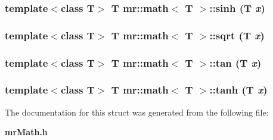 \subsubsection{\setlength{\rightskip}{0pt plus 5cm}template$<$class T$>$ T {\bf mr::math}$<$ T $>$::sinh (T {\em x})\hspace{0.3cm}{\tt  [inline, static]}}\label{structmr_1_1math_e8}


\subsubsection{\setlength{\rightskip}{0pt plus 5cm}template$<$class T$>$ T {\bf mr::math}$<$ T $>$::sqrt (T {\em x})\hspace{0.3cm}{\tt  [inline, static]}}\label{structmr_1_1math_e15}


\subsubsection{\setlength{\rightskip}{0pt plus 5cm}template$<$class T$>$ T {\bf mr::math}$<$ T $>$::tan (T {\em x})\hspace{0.3cm}{\tt  [inline, static]}}\label{structmr_1_1math_e6}


\subsubsection{\setlength{\rightskip}{0pt plus 5cm}template$<$class T$>$ T {\bf mr::math}$<$ T $>$::tanh (T {\em x})\hspace{0.3cm}{\tt  [inline, static]}}\label{structmr_1_1math_e9}




The documentation for this struct was generated from the following file:\begin{CompactItemize}
\item 
{\bf mr\-Math.h}\end{CompactItemize}
